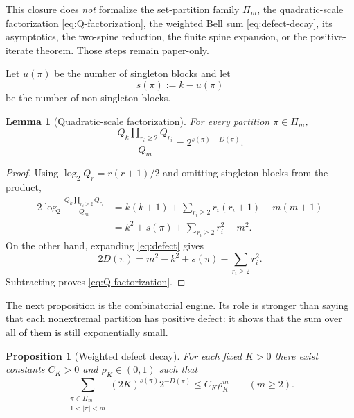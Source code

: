 \documentclass[11pt,oneside]{article}
\newtheorem{proposition}[theorem]{Proposition}
\newtheorem{lemma}[theorem]{Lemma}
\theoremstyle{definition}
\theoremstyle{remark}
\begin{document}
This closure does \emph{not} formalize the set-partition family \(\Pi_m\),
the quadratic-scale factorization \eqref{eq:Q-factorization}, the weighted
Bell sum \eqref{eq:defect-decay}, its asymptotics, the two-spine reduction,
the finite spine expansion, or the positive-iterate theorem.  Those steps
remain paper-only.

Let $u(\pi)$ be the number of singleton blocks and let
\begin{equation}
 s(\pi):=k-u(\pi)
 \label{eq:s-nonsingleton}
\end{equation}
be the number of non-singleton blocks.

\begin{lemma}[Quadratic-scale factorization]
\label{lem:Q-factorization}
For every partition $\pi\in\Pi_m$,
\begin{equation}
 \frac{Q_k\prod_{r_i\geq2}Q_{r_i}}{Q_m}
 =2^{s(\pi)-D(\pi)}.
 \label{eq:Q-factorization}
\end{equation}
\end{lemma}

\begin{proof}
Using $\log_2Q_r=r(r+1)/2$ and omitting singleton blocks from the product,
\begin{align*}
 2\log_2\frac{Q_k\prod_{r_i\ge2}Q_{r_i}}{Q_m}
 &=k(k+1)+\sum_{r_i\ge2}r_i(r_i+1)-m(m+1)\\
 &=k^2+s(\pi)+\sum_{r_i\ge2}r_i^2-m^2.
\end{align*}
On the other hand, expanding \eqref{eq:defect} gives
\[
 2D(\pi)=m^2-k^2+s(\pi)-\sum_{r_i\ge2}r_i^2.
\]
Subtracting proves \eqref{eq:Q-factorization}.
\end{proof}

The next proposition is the combinatorial engine.  Its role is stronger than saying
that each nonextremal partition has positive defect: it shows that the sum over all
of them is still exponentially small.

\begin{proposition}[Weighted defect decay]
\label{prop:defect-decay}
For each fixed $K>0$ there exist constants $C_K>0$ and $\rho_K\in(0,1)$ such that
\begin{equation}
 \sum_{\substack{\pi\in\Pi_m\\1<|\pi|<m}}
   (2K)^{s(\pi)}2^{-D(\pi)}
 \leq C_K\rho_K^m
 \qquad(m\geq2).
 \label{eq:defect-decay}
\end{equation}
\end{proposition}
\end{document}
